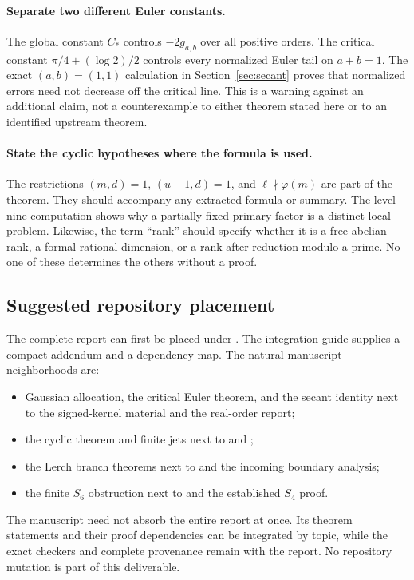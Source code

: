 \documentclass[11pt,a4paper]{article}
\numberwithin{equation}{section}
\theoremstyle{definition}
\theoremstyle{remark}
\begin{document}
\paragraph{Separate two different Euler constants.}
The global constant $C_*$ controls $-2g_{a,b}$ over all positive orders.
The critical constant $\pi/4+(\log2)/2$ controls every normalized Euler
tail on $a+b=1$. The exact $(a,b)=(1,1)$ calculation in
Section~\ref{sec:secant} proves that normalized errors need not decrease
off the critical line. This is a warning against an additional claim,
not a counterexample to either theorem stated here or to an identified
upstream theorem.

\paragraph{State the cyclic hypotheses where the formula is used.}
The restrictions $(m,d)=1$, $(u-1,d)=1$, and
$\ell\nmid\varphi(m)$ are part of the theorem. They should accompany
any extracted formula or summary. The level-nine computation shows
why a partially fixed primary factor is a distinct local problem.
Likewise, the term ``rank'' should specify whether it is a free
abelian rank, a formal rational dimension, or a rank after reduction
modulo a prime. No one of these determines the others without a proof.

\subsection{Suggested repository placement}

The complete report can first be placed under
.
The integration guide supplies a compact addendum and a dependency
map. The natural manuscript neighborhoods are:
\begin{itemize}
\item Gaussian allocation, the critical Euler theorem, and the secant
identity next to the signed-kernel material and the real-order report;
\item the cyclic theorem and finite jets next to
 and ;
\item the Lerch branch theorems next to
 and the incoming boundary analysis;
\item the finite $S_6$ obstruction next to
 and the established $S_4$ proof.
\end{itemize}
The manuscript need not absorb the entire report at once. Its theorem
statements and their proof dependencies can be integrated by topic,
while the exact checkers and complete provenance remain with the report.
No repository mutation is part of this deliverable.
\end{document}
